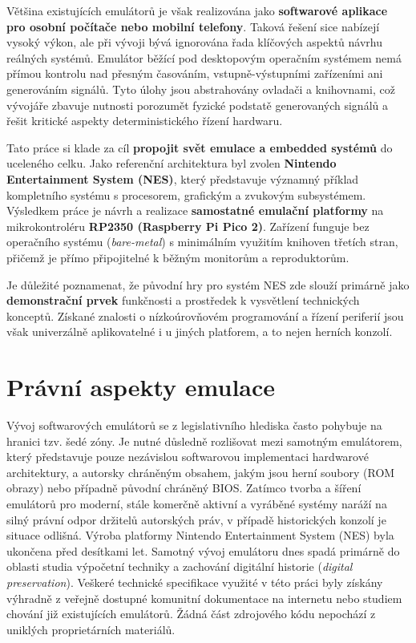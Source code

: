 \documentclass{soc}
\begin{document}
Většina existujících emulátorů je však realizována jako \textbf{softwarové aplikace pro osobní
počítače nebo mobilní telefony}. Taková řešení sice nabízejí vysoký výkon, ale při vývoji bývá
ignorována řada klíčových aspektů návrhu reálných systémů. Emulátor běžící pod desktopovým operačním
systémem nemá přímou kontrolu nad přesným časováním, vstupně-výstupními zařízeními ani generováním
signálů. Tyto úlohy jsou abstrahovány ovladači a knihovnami, což vývojáře zbavuje nutnosti porozumět
fyzické podstatě generovaných signálů a řešit kritické aspekty deterministického řízení hardwaru.

Tato práce si klade za cíl \textbf{propojit svět emulace a embedded systémů} do uceleného celku.
Jako referenční architektura byl zvolen \textbf{Nintendo Entertainment System (NES)}, který
představuje významný příklad kompletního systému s procesorem, grafickým a zvukovým subsystémem.
Výsledkem práce je návrh a realizace \textbf{samostatné emulační platformy} na mikrokontroléru
\textbf{RP2350 (Raspberry Pi Pico 2)}. Zařízení funguje bez operačního systému (\textit{bare-metal})
s minimálním využitím knihoven třetích stran, přičemž je přímo připojitelné k běžným monitorům a
reproduktorům.

Je důležité poznamenat, že původní hry pro systém NES zde slouží primárně jako \textbf{demonstrační
prvek} funkčnosti a prostředek k vysvětlení technických konceptů. Získané znalosti o nízkoúrovňovém
programování a řízení periferií jsou však univerzálně aplikovatelné i u jiných platforem, a to nejen
herních konzolí.

\chapter*{Právní aspekty emulace}

Vývoj softwarových emulátorů se z legislativního hlediska často pohybuje na hranici tzv. šedé zóny.
Je nutné důsledně rozlišovat mezi samotným emulátorem, který představuje pouze nezávislou
softwarovou implementaci hardwarové architektury, a autorsky chráněným obsahem, jakým jsou herní
soubory (ROM obrazy) nebo případně původní chráněný BIOS. Zatímco tvorba a šíření emulátorů pro
moderní, stále komerčně aktivní a vyráběné systémy naráží na silný právní odpor držitelů autorských
práv, v případě historických konzolí je situace odlišná. Výroba platformy Nintendo Entertainment
System (NES) byla ukončena před desítkami let. Samotný vývoj emulátoru dnes spadá primárně do
oblasti studia výpočetní techniky a zachování digitální historie (\textit{digital preservation}).
Veškeré technické specifikace využité v této práci byly získány výhradně z veřejně dostupné
komunitní dokumentace na internetu nebo studiem chování již existujících emulátorů. Žádná část
zdrojového kódu nepochází z uniklých proprietárních materiálů.
\end{document}

